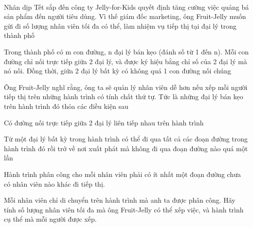  

Nhân dịp Tết sắp đến công ty Jelly-for-Kids quyết định tăng cường việc quảng bá sản phẩm đến người tiêu dùng. Vì thế giám đốc marketing, ông Fruit-Jelly muốn gửi đi số lượng nhân viên tối đa có thể, làm nhiệm vụ tiếp thị tại đại lý trong thành phố

Trong thành phố có m con đường, n đại lý bán kẹo (đánh số từ 1 đến n). Mỗi con đường chỉ nối trực tiếp giữa 2 đại lý, và được ký hiệu bằng chỉ số của 2 đại lý mà nó nối. Đồng thời, giữa 2 đại lý bất kỳ có không quá 1 con đường nối chúng

Ông Fruit-Jelly nghĩ rằng, ông ta sẽ quản lý nhân viên dễ hơn nếu xếp mỗi người tiếp thị trên những hành trình có tính chất thứ tự. Tức là những đại lý bán kẹo trên hành trình đó thỏa các điều kiện sau

Có đường nối trực tiếp giữa 2 đại lý liên tiếp nhau trên hành trình

Từ một đại lý bất kỳ trong hành trình có thể đi qua tất cả các đoạn đường trong hành trình đó rồi trở về nơi xuất phát mà không đi qua đoạn đường nào quá một lần

Hành trình phân công cho mỗi nhân viên phải có ít nhất một đoạn đường chưa có nhân viên nào khác đi tiếp thị.

Mỗi nhân viên chỉ di chuyển trên hành trình mà anh ta được phân công. Hãy tính số lượng nhân viên tối đa mà ông Fruit-Jelly có thể xếp việc, và hành trình cụ thể mà mỗi người được xếp.